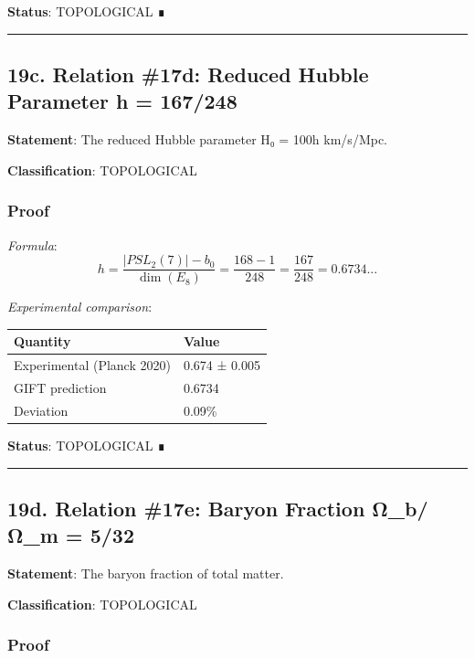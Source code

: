 \documentclass[11pt,a4paper]{article}
\begin{document}
\textbf{Status}: TOPOLOGICAL ∎

\begin{center}\rule{0.5\linewidth}{0.5pt}\end{center}

\subsection{19c. Relation \#17d: Reduced Hubble Parameter h = 167/248}\label{c.-relation-17d-reduced-hubble-parameter-h-167248}

\textbf{Statement}: The reduced Hubble parameter H₀ = 100h km/s/Mpc.

\textbf{Classification}: TOPOLOGICAL

\subsubsection{Proof}\label{proof-23}

\emph{Formula}:
\[h = \frac{|PSL_2(7)| - b_0}{\dim(E_8)} = \frac{168 - 1}{248} = \frac{167}{248} = 0.6734...\]

\emph{Experimental comparison}:

{\def\LTcaptype{none} %
\begin{longtable}[]{@{}ll@{}}
\toprule\noalign{}
Quantity & Value \\
\midrule\noalign{}
\endhead
\bottomrule\noalign{}
\endlastfoot
Experimental (Planck 2020) & 0.674 ± 0.005 \\
GIFT prediction & 0.6734 \\
Deviation & 0.09\% \\
\end{longtable}
}

\textbf{Status}: TOPOLOGICAL ∎

\begin{center}\rule{0.5\linewidth}{0.5pt}\end{center}

\subsection{19d. Relation \#17e: Baryon Fraction Ω\_b/Ω\_m = 5/32}\label{d.-relation-17e-baryon-fraction-ux3c9_bux3c9_m-532}

\textbf{Statement}: The baryon fraction of total matter.

\textbf{Classification}: TOPOLOGICAL

\subsubsection{Proof}\label{proof-24}
\end{document}
